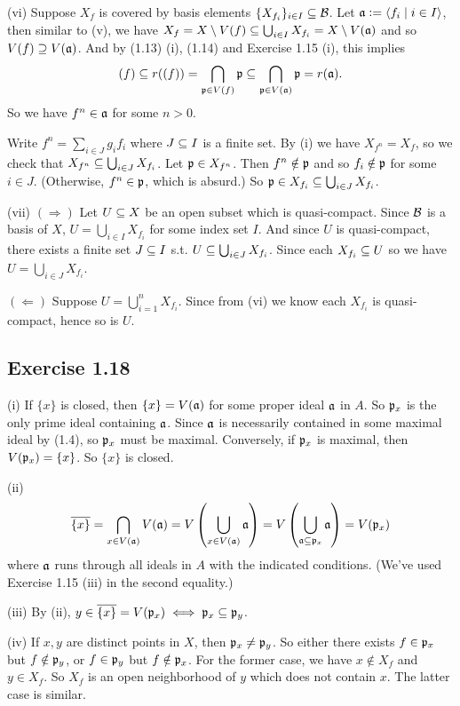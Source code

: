\documentclass[../A&M.tex]{subfiles}
\begin{document}
(vi) Suppose $X_f$ is covered by basis elements $\{X_{f_i}\}_{i\in I} \subseteq \mathcal{B}$. Let $\mathfrak{a}:=\langle f_i \mid i\in I \rangle$, then similar to (v), we have $X_f = X\setminus V(f) \subseteq \bigcup_{i\in I} X_{f_i} = X\setminus V(\mathfrak{a})$ and so $V(f)\supseteq V(\mathfrak{a})$. And by (1.13) (i), (1.14) and Exercise 1.15 (i), this implies
$$
(f) \subseteq r((f)) = \bigcap_{\mathfrak{p}\in V(f)} \mathfrak{p} \subseteq \bigcap_{\mathfrak{p}\in V(\mathfrak{a})} \mathfrak{p} = r(\mathfrak{a}).
$$
So we have $f^n\in\mathfrak{a}$ for some $n>0$.

Write $f^n=\sum_{i\in J} g_if_i$ where $J\subseteq I$ is a finite set. By (i) we have $X_{f^n} = X_f$, so we check that $X_{f^n} \subseteq \bigcup_{i\in J} X_{f_i}$. Let $\mathfrak{p}\in X_{f^n}$. Then $f^n\notin\mathfrak{p}$ and so $f_i\notin \mathfrak{p}$ for some $i\in J$. (Otherwise, $f^n\in \mathfrak{p}$, which is absurd.) So $\mathfrak{p}\in X_{f_i} \subseteq \bigcup_{i\in J} X_{f_i}$.

(vii) $(\Rightarrow)$ Let $U\subseteq X$ be an open subset which is quasi-compact. Since $\mathcal{B}$ is a basis of $X$, $U=\bigcup_{i\in I} X_{f_i}$ for some index set $I$. And since $U$ is quasi-compact, there exists a finite set $J\subseteq I$ s.t. $U\subseteq \bigcup_{i\in J} X_{f_i}$. Since each $X_{f_i} \subseteq U$ so we have $U = \bigcup_{i\in J} X_{f_i}$.

$(\Leftarrow)$ Suppose $U = \bigcup_{i=1}^n X_{f_i}$. Since from (vi) we know each $X_{f_i}$ is quasi-compact, hence so is $U$.

\subsection*{Exercise 1.18}

(i) If $\{x\}$ is closed, then $\{x\}=V(\mathfrak{a})$ for some proper ideal $\mathfrak{a}$ in $A$. So $\mathfrak{p}_x$ is the only prime ideal containing $\mathfrak{a}$. Since $\mathfrak{a}$ is necessarily contained in some maximal ideal by (1.4), so $\mathfrak{p}_x$ must be maximal. Conversely, if $\mathfrak{p}_x$ is maximal, then $V(\mathfrak{p}_x)=\{x\}$. So $\{x\}$ is closed.

(ii)
$$
\overline{\{x\}} = \bigcap_{x\in V(\mathfrak{a})} V(\mathfrak{a}) = V\left( \bigcup_{x\in V(\mathfrak{a})} \mathfrak{a} \right) = V\left( \bigcup_{\mathfrak{a}\subseteq \mathfrak{p}_x} \mathfrak{a} \right) = V(\mathfrak{p}_x)
$$
where $\mathfrak{a}$ runs through all ideals in $A$ with the indicated conditions. (We've used Exercise 1.15 (iii) in the second equality.)

(iii) By (ii), $y\in\overline{\{x\}} = V(\mathfrak{p}_x) \iff \mathfrak{p}_x \subseteq \mathfrak{p}_y$.

(iv) If $x,y$ are distinct points in $X$, then $\mathfrak{p}_x\neq\mathfrak{p}_y$. So either there exists $f\in\mathfrak{p}_x$ but $f\notin\mathfrak{p}_y$, or $f\in\mathfrak{p}_y$ but $f\notin\mathfrak{p}_x$. For the former case, we have $x\notin X_f$ and $y\in X_f$. So $X_f$ is an open neighborhood of $y$ which does not contain $x$. The latter case is similar.
\end{document}
